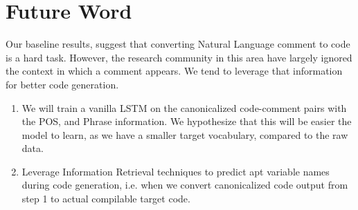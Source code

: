 \documentclass{IEEEtran}
\begin{document}
    \section{Future Word}
    Our baseline results, suggest that converting Natural Language comment to code
    is a hard task. However, the research community in this area have largely ignored
    the context in which a comment appears. We tend to leverage that information
    for better code generation.
  \begin{enumerate}
    \item We will train a vanilla LSTM on the canonicalized code-comment pairs with
       the POS, and Phrase information. We hypothesize that this will be easier
       the model to learn, as we have a smaller target vocabulary, compared to the
       raw data.
    \item Leverage Information Retrieval techniques to predict apt variable names
       during code generation, i.e. when we convert canonicalized code output   
       from step 1 to actual compilable target code.
      \end{enumerate}
    
    
\end{document}

